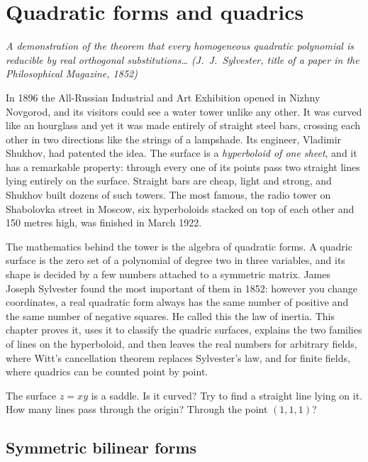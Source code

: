 \chapter{Quadratic forms and quadrics}\label{geometry:ch:quadrics}

\begin{center}\itshape
A demonstration of the theorem that every homogeneous quadratic polynomial is reducible by real orthogonal substitutions\dots
\upshape(J.~J.~Sylvester, title of a paper in the \emph{Philosophical Magazine}, 1852)
\end{center}

In 1896 the All-Russian Industrial and Art Exhibition opened in Nizhny Novgorod, and its visitors could see a water tower unlike any other. It
was curved like an hourglass and yet it was made entirely of straight steel bars, crossing each other in two directions like the strings of a
lampshade. Its engineer, Vladimir Shukhov, had patented the idea. The surface is a \emph{hyperboloid of one sheet}, and it has a remarkable property:
through every one of its points pass two straight lines lying entirely on the surface. Straight bars are cheap, light and strong, and Shukhov built
dozens of such towers. The most famous, the radio tower on Shabolovka street in Moscow, six hyperboloids stacked on top of each other and 150 metres
high, was finished in March 1922.

The mathematics behind the tower is the algebra of quadratic forms. A quadric surface is the zero set of a polynomial of degree two in three
variables, and its shape is decided by a few numbers attached to a symmetric matrix. James Joseph Sylvester found the most important of them in
1852: however you change coordinates, a real quadratic form always has the same number of positive and the same number of negative squares. He
called this the law of inertia. This chapter proves it, uses it to classify the quadric surfaces, explains the two families of lines on the
hyperboloid, and then leaves the real numbers for arbitrary fields, where Witt's cancellation theorem replaces Sylvester's law, and for finite fields,
where quadrics can be counted point by point.

\begin{think}
The surface $z=xy$ is a saddle. Is it curved? Try to find a straight line lying on it. How many lines pass through the origin? Through the point
$(1,1,1)$?
\end{think}

\section{Symmetric bilinear forms}

